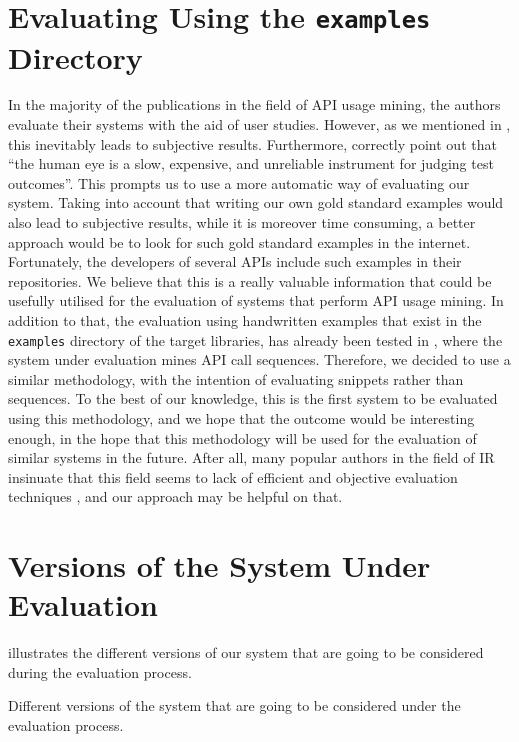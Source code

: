 \section{Evaluating Using the \texttt{examples} Directory}
\label{sec:examples-evaluation}

In the majority of the publications in the field of API usage mining, the authors evaluate their systems with the aid of user studies. However, as we mentioned in , this inevitably leads to subjective results. Furthermore,  \cite{Young:2005} correctly point out that ``the human eye is a slow, expensive, and unreliable instrument for judging test outcomes''. This prompts us to use a more automatic way of evaluating our system. Taking into account that writing our own gold standard examples would also lead to subjective results, while it is moreover time consuming, a better approach would be to look for such gold standard examples in the internet. Fortunately, the developers of several APIs include such examples in their repositories. We believe that this is a really valuable information that could be usefully utilised for the evaluation of systems that perform API usage mining. In addition to that, the evaluation using handwritten examples that exist in the \texttt{examples} directory of the target libraries, has already been tested in \cite{Fowkes2:2015}, where the system under evaluation mines API call sequences. Therefore, we decided to use a similar methodology, with the intention of evaluating snippets rather than sequences. To the best of our knowledge, this is the first system to be evaluated using this methodology, and we hope that the outcome would be interesting enough, in the hope that this methodology will be used for the evaluation of similar systems in the future. After all, many popular authors in the field of IR insinuate that this field seems to lack of efficient and objective evaluation techniques \cite{Manning:2008}, and our approach may be helpful on that.


\section{Versions of the System Under Evaluation}
\label{sec:evaluation-versions}

 illustrates the different versions of our system that are going to be considered during the evaluation process.

\begin{table}[ht]
\centering
\small
\caption[System versions]{Different versions of the system that are going to be considered under the evaluation process.}
\label{tables:evaluation-versions}

\end{table}


